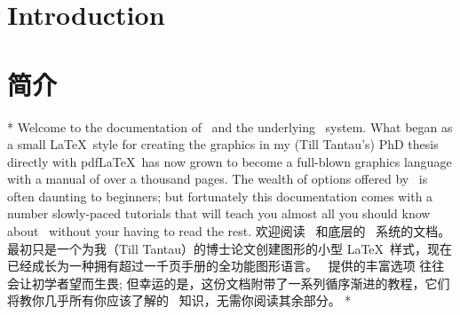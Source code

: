 %
%
%
\begin{paracol}{2}
\section{Introduction}
\switchcolumn
\section{简介}
\switchcolumn[0]*%
Welcome to the documentation of \tikzname\ and the underlying \pgfname\ system.
What began as a small \LaTeX\ style for creating the graphics in my (Till
Tantau's) PhD thesis directly with pdf\LaTeX\ has now grown to become a
full-blown graphics language with a manual of over a thousand pages. The wealth
of options offered by \tikzname\ is often daunting to beginners; but
fortunately this documentation comes with a number slowly-paced tutorials that
will teach you almost all you should know about \tikzname\ without your having
to read the rest.
\switchcolumn
欢迎阅读 \tikzname\ 和底层的 \pgfname\ 系统的文档。最初只是一个为我（Till Tantau）的博士论文创建图形的小型 \LaTeX\ 样式，现在已经成长为一种拥有超过一千页手册的全功能图形语言。 \tikzname\ 提供的丰富选项%
往往会让初学者望而生畏;%
但幸运的是，这份文档附带了一系列循序渐进的教程，它们将教你几乎所有你应该了解的 \tikzname\ 知识，无需你阅读其余部分。
\switchcolumn[0]*%



\end{paracol}
